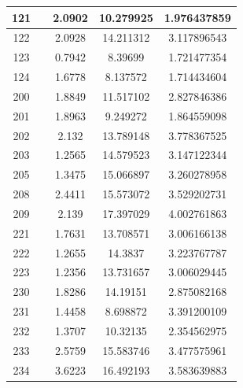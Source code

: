 \begin{table}[!tp]
\begin{tabular}{|c|c|c|c|c|}
		121 & & 2.0902 & 10.279925 & 1.976437859\\ \hline
		122 & & 2.0928 & 14.211312 & 3.117896543\\ \hline
		123 & & 0.7942 &  8.39699  & 1.721477354\\ \hline
		124 & & 1.6778 &  8.137572 & 1.714434604\\ \hline
		200 & & 1.8849 & 11.517102 & 2.827846386\\ \hline
		201 & & 1.8963 &  9.249272 & 1.864559098\\ \hline
		202 & & 2.132  & 13.789148 & 3.778367525\\ \hline
		203 & & 1.2565 & 14.579523 & 3.147122344\\ \hline
		205 & & 1.3475 & 15.066897 & 3.260278958\\ \hline
		208 & & 2.4411 & 15.573072 & 3.529202731\\ \hline
		209 & & 2.139  & 17.397029 & 4.002761863\\ \hline
		221 & & 1.7631 & 13.708571 & 3.006166138\\ \hline
		222 & & 1.2655 & 14.3837   & 3.223767787\\ \hline
		223 & & 1.2356 & 13.731657 & 3.006029445\\ \hline
		230 & & 1.8286 & 14.19151  & 2.875082168\\ \hline
		231 & & 1.4458 &  8.698872 & 3.391200109\\ \hline
		232 & & 1.3707 & 10.32135  & 2.354562975\\ \hline
		233 & & 2.5759 & 15.583746 & 3.477575961\\ \hline
		234 & & 3.6223 & 16.492193 & 3.583639883\\ \hline
	\end{tabular}
\end{table}

